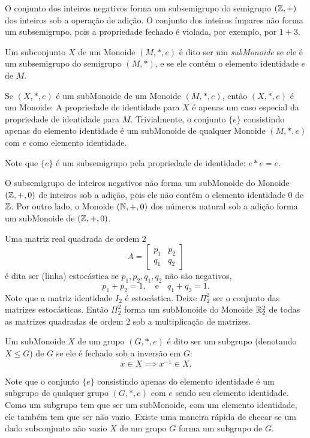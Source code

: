 \begin{exmp}
  O conjunto dos inteiros negativos forma um subsemigrupo do semigrupo $(\mathbb{Z}, +)$ dos inteiros sob a operação de adição. O conjunto dos inteiros ímpares não forma um subsemigrupo, pois a propriedade fechado é violada, por exemplo, por $1 + 3$.
\end{exmp}

\begin{definition}[SubMonoides]
  Um subconjunto $X$ de um Monoide $(M,*,e)$ é dito ser um \emph{subMonoide} se ele é um subsemigrupo do semigrupo $(M,*)$, e se ele contém o elemento identidade $e$ de $M$.
\end{definition}
Se $(X,*,e)$ é um subMonoide de um Monoide $(M,*,e)$, então $(X,*,e)$ é um Monoide: A propriedade de identidade para $X$ é apenas um caso especial da propriedade de identidade para $M$. Trivialmente, o conjunto $\{e\}$ consistindo apenas do elemento identidade é um subMonoide de qualquer Monoide $(M,*,e)$ com $e$ como elemento identidade.

Note que $\{e\}$ é um subsemigrupo pela propriedade de identidade: $e * e = e$.

\begin{exmp}
  O subsemigrupo de inteiros negativos não forma um subMonoide do Monoide $(\mathbb{Z},+,0)$ de inteiros sob a adição, pois ele não contém o elemento identidade $0$ de $\mathbb{Z}$. Por outro lado, o Monoide $(\mathbb{N}, +,0)$ dos números natural sob a adição forma um subMonoide de $(\mathbb{Z}, +,0)$.
\end{exmp}
\begin{exmp}
  Uma matriz real quadrada de ordem $2$
  $$A=\begin{bmatrix}
    p_{1} & p_{2}\\
    q_{1} & q_{2}
  \end{bmatrix}$$
  é dita ser (linha) estocástica se $p_{1},p_{2},q_{1},q_{2}$ não são negativos,
  $$p_{1} + p_{2} = 1,\quad \textrm{e}\quad q_{1} + q_{2} = 1.$$
  Note que a matriz identidade $I_{2}$ é estocástica. Deixe $\Pi_{2}^{2}$ ser o conjunto das matrizes estocásticas. Então $\Pi_{2}^{2}$ forma um subMonoide do Monoide $\mathbb{R}_{2}^{2}$ de todas as matrizes quadradas de ordem $2$ sob a multiplicação de matrizes.
\end{exmp}
\begin{definition}[Subgrupos]
  Um subMonoide $X$ de um grupo $(G,*,e)$ é dito ser um subgrupo (denotando $X \leq G$) de $G$ se ele é fechado sob a inversão em $G$:
  $$x\in X \implies x^{-1} \in X.$$
\end{definition}
Note que o conjunto $\{e\}$ consistindo apenas do elemento identidade é um subgrupo de qualquer grupo $(G,*,e)$ com $e$ sendo seu elemento identidade. Como um subgrupo tem que ser um subMonoide, com um elemento identidade, ele também tem que ser não vazio. Existe uma maneira rápida de checar se um dado subconjunto não vazio $X$ de um grupo $G$ forma um subgrupo de $G$.

